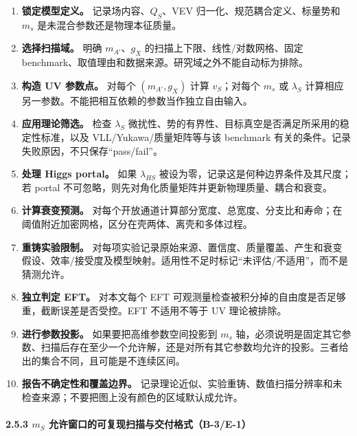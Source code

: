 \documentclass[
]{article}
\providecommand{\tightlist}{%
  \setlength{\itemsep}{0pt}\setlength{\parskip}{0pt}}
\begin{document}
\begin{enumerate}
\def\labelenumi{\arabic{enumi}.}
\tightlist
\item
  \textbf{锁定模型定义。} 记录场内容、\(Q_S\)、VEV
  归一化、规范耦合定义、标量势和 \(m_s\) 是未混合参数还是物理本征质量。
\item
  \textbf{选择扫描域。} 明确 \(m_{A'}\)、\(g_X\)
  的扫描上下限、线性/对数网格、固定
  benchmark、取值理由和数据来源。研究域之外不能自动标为排除。
\item
  \textbf{构造 UV 参数点。} 对每个 \((m_{A'},g_X)\) 计算 \(v_S\)；对每个
  \(m_s\) 或 \(\lambda_S\)
  计算相应另一参数。不能把相互依赖的参数当作独立自由输入。
\item
  \textbf{应用理论筛选。} 检查 \(\lambda_S\)
  微扰性、势的有界性、目标真空是否满足所采用的稳定性标准，以及
  VLL/Yukawa/质量矩阵等与该 benchmark
  有关的条件。记录失败原因，不只保存``pass/fail''。
\item
  \textbf{处理 Higgs portal。} 如果 \(\lambda_{HS}\)
  被设为零，记录这是何种边界条件及其尺度；若 portal
  不可忽略，则先对角化质量矩阵并更新物理质量、耦合和衰变。
\item
  \textbf{计算衰变预测。}
  对每个开放通道计算部分宽度、总宽度、分支比和寿命；在阈值附近加密网格，区分在壳两体、离壳和多体过程。
\item
  \textbf{重铸实验限制。}
  对每项实验记录原始来源、置信度、质量覆盖、产生和衰变假设、效率/接受度及模型映射。适用性不足时标记``未评估/不适用''，而不是猜测允许。
\item
  \textbf{独立判定 EFT。} 对本文每个 EFT
  可观测量检查被积分掉的自由度是否足够重，截断误差是否受控。EFT
  不适用不等于 UV 理论被排除。
\item
  \textbf{进行参数投影。} 如果要把高维参数空间投影到 \(m_s\)
  轴，必须说明是固定其它参数、扫描后存在至少一个允许解，还是对所有其它参数均允许的投影。三者给出的集合不同，且可能是不连续区间。
\item
  \textbf{报告不确定性和覆盖边界。}
  记录理论近似、实验重铸、数值扫描分辨率和未检查来源；不要把图上没有颜色的区域默认成允许。
\end{enumerate}

\paragraph{\texorpdfstring{2.5.3 \(m_S\)
允许窗口的可复现扫描与交付格式（B-3/E-1）}{2.5.3 m\_S 允许窗口的可复现扫描与交付格式（B-3/E-1）}}\label{m_s-ux5141ux8bb8ux7a97ux53e3ux7684ux53efux590dux73b0ux626bux63cfux4e0eux4ea4ux4ed8ux683cux5f0fb-3e-1}
\end{document}
